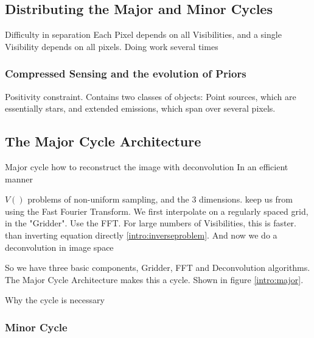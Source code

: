 \subsection{Distributing the Major and Minor Cycles}
Difficulty in separation
Each Pixel depends on all Visibilities, and a single Visibility depends on all pixels.
Doing work several times

\subsubsection{Compressed Sensing and the evolution of Priors}
Positivity constraint.
Contains two classes of objects: Point sources, which are essentially stars, and extended emissions, which span over several pixels.


\subsection{The Major Cycle Architecture}
Major cycle how to reconstruct the image with deconvolution
In an efficient manner

$V()$ problems of non-uniform sampling, and the 3 dimensions. keep us from using the Fast Fourier Transform.
We first interpolate on a regularly spaced grid, in the "Gridder".
Use the FFT. For large numbers of Visibilities, this is faster. than inverting equation directly \eqref{intro:inverseproblem}.
And now we do a deconvolution in image space

So we have three basic components, Gridder, FFT and Deconvolution algorithms.
The Major Cycle Architecture makes this a cycle.
Shown in figure \ref{intro:major}.



Why the cycle is necessary



\subsubsection{Minor Cycle}


